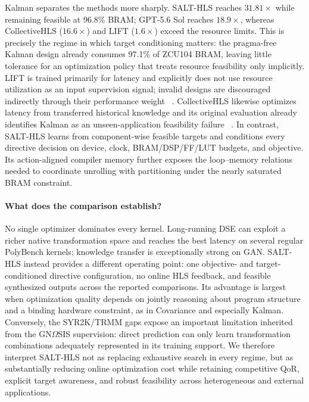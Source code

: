 Kalman separates the methods more sharply. SALT-HLS reaches
$31.81\times$ while remaining feasible at 96.8\% BRAM; GPT-5.6 Sol
reaches $18.9\times$, whereas CollectiveHLS ($16.6\times$) and
LIFT ($1.6\times$) exceed the resource limits. This is precisely the
regime in which target conditioning matters: the pragma-free Kalman
design already consumes 97.1\% of ZCU104 BRAM, leaving little tolerance
for an optimization policy that treats resource feasibility only
implicitly. LIFT is trained primarily for latency and explicitly does
not use resource utilization as an input supervision signal; invalid
designs are discouraged indirectly through their performance weight
~\cite{prakriya2025lift}. CollectiveHLS likewise optimizes latency from
transferred historical knowledge and its original evaluation already
identifies Kalman as an unseen-application feasibility failure
~\cite{ferikoglou2024collectivehls}. In contrast, SALT-HLS learns from
component-wise feasible targets and conditions every directive decision
on device, clock, BRAM/DSP/FF/LUT budgets, and objective. Its
action-aligned compiler memory further exposes the loop--memory relations
needed to coordinate unrolling with partitioning under the nearly
saturated BRAM constraint.

\paragraph{What does the comparison establish?}
No single optimizer dominates every kernel. Long-running DSE can exploit
a richer native transformation space and reaches the best latency on
several regular PolyBench kernels; knowledge transfer is exceptionally
strong on GAN. SALT-HLS instead provides a different operating point:
one objective- and target-conditioned directive configuration, no online
HLS feedback, and feasible synthesized outputs across the reported
comparisons. Its advantage is largest when optimization quality depends
on jointly reasoning about program structure and a binding hardware
constraint, as in Covariance and especially Kalman. Conversely, the
SYR2K/TRMM gaps expose an important limitation inherited from the
GN$\Omega$SIS supervision: direct prediction can only learn
transformation combinations adequately represented in its training
support. We therefore interpret SALT-HLS not as replacing exhaustive
search in every regime, but as substantially reducing online optimization
cost while retaining competitive QoR, explicit target awareness, and
robust feasibility across heterogeneous and external applications.




